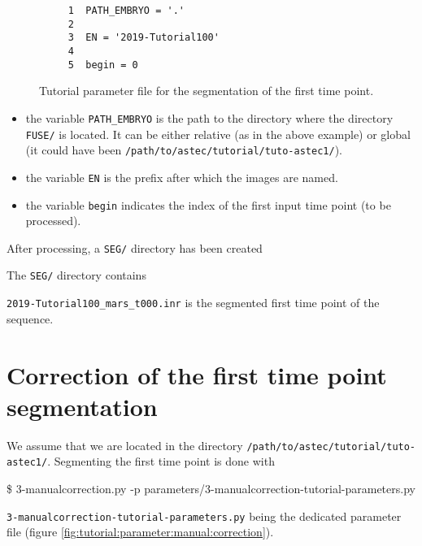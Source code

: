 \begin{figure}
\begin{framed}
\begin{verbatim}
     1	PATH_EMBRYO = '.'
     2	
     3	EN = '2019-Tutorial100'
     4	
     5	begin = 0
\end{verbatim}
\end{framed}
\caption{\label{fig:tutorial:parameter:mars} Tutorial
  parameter file for the segmentation of the first time point.}
\end{figure}


\begin{itemize}
  \itemsep -1ex
  \item the variable \texttt{PATH\_EMBRYO} is the path to the directory where
    the directory \texttt{FUSE/} is located. It can be either relative (as in the
    above example) or
    global (it could have been \texttt{/path/to/astec/tutorial/tuto-astec1/}).
  \item the variable \texttt{EN} is the prefix after which the  images
    are named. 
  \item the variable \texttt{begin} indicates  the
    index of the first input time point (to be processed).
\end{itemize}

After processing, a \texttt{SEG/} directory has been created

\mbox{}
\mbox{}

The \texttt{SEG/} directory contains

\mbox{}
\mbox{}

\texttt{2019-Tutorial100\_mars\_t000.inr} is the segmented first
  time point of the sequence.



\section{Correction of  the first time point segmentation}
\label{sec:tutorial:manual:correction}


We assume that we are located in the directory
\texttt{/path/to/astec/tutorial/tuto-astec1/}. Segmenting the first
time point is
done with
\begin{code}{0.8}
  \$ 3-manualcorrection.py -p parameters/3-manualcorrection-tutorial-parameters.py 
\end{code}
\texttt{3-manualcorrection-tutorial-parameters.py} being the
dedicated parameter file  (figure \ref{fig:tutorial:parameter:manual:correction}).

